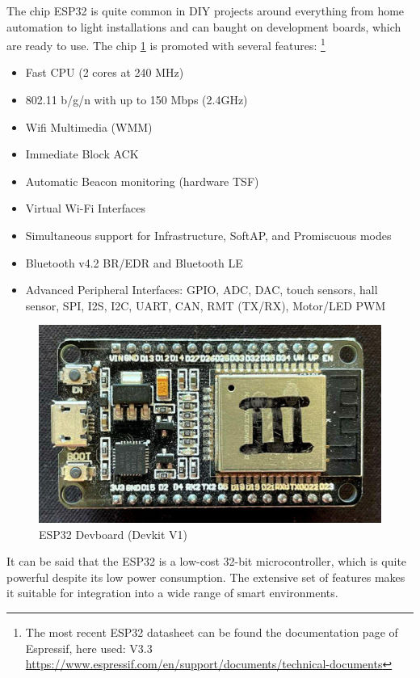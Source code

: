 The chip ESP32 is quite common in DIY projects around everything from home automation to light installations 
and can baught on development boards, which are ready to use.
The chip \ref{fig:esp32} is promoted with several features: 
\footnote{The most recent ESP32 datasheet can be found the documentation page of Espressif, here used: V3.3\\
	\url{https://www.espressif.com/en/support/documents/technical-documents}}
\begin{itemize}
	\setlength\itemsep{-0.0em}
	\item Fast CPU (2 cores at 240 MHz)
	\item 802.11 b/g/n with up to 150 Mbps (2.4GHz)
	\item Wifi Multimedia (WMM)
	\item Immediate Block ACK
	\item Automatic Beacon monitoring (hardware TSF)
	\item Virtual Wi-Fi Interfaces
	\item Simultaneous support for Infrastructure, SoftAP, and Promiscuous modes
	\item Bluetooth v4.2 BR/EDR and Bluetooth LE
	\item Advanced Peripheral Interfaces: GPIO, ADC, DAC, touch sensors, hall sensor, 
	SPI, I2S, I2C, UART, CAN, RMT (TX/RX), Motor/LED PWM 
\end{itemize}

\begin{figure}[h]
	\centering
	\includegraphics[scale=0.2]{figures/espdevboard.jpg}
	\caption{ESP32 Devboard (Devkit V1)}
	\label{fig:esp32}%
\end{figure}

It can be said that the ESP32 is a low-cost 32-bit microcontroller,
which is quite powerful despite its low power consumption.
The extensive set of features makes it suitable for integration into a wide range of smart environments.

